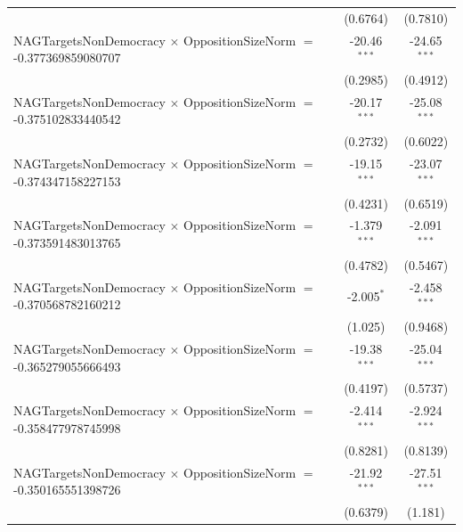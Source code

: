 \begin{tabular}{lcc}
                                                                                & (0.6764)             & (0.7810)\\   
   NAGTargetsNonDemocracy $\times$ OppositionSizeNorm $=$ -0.377369859080707    & -20.46$^{***}$       & -24.65$^{***}$\\   
                                                                                & (0.2985)             & (0.4912)\\   
   NAGTargetsNonDemocracy $\times$ OppositionSizeNorm $=$ -0.375102833440542    & -20.17$^{***}$       & -25.08$^{***}$\\   
                                                                                & (0.2732)             & (0.6022)\\   
   NAGTargetsNonDemocracy $\times$ OppositionSizeNorm $=$ -0.374347158227153    & -19.15$^{***}$       & -23.07$^{***}$\\   
                                                                                & (0.4231)             & (0.6519)\\   
   NAGTargetsNonDemocracy $\times$ OppositionSizeNorm $=$ -0.373591483013765    & -1.379$^{***}$       & -2.091$^{***}$\\   
                                                                                & (0.4782)             & (0.5467)\\   
   NAGTargetsNonDemocracy $\times$ OppositionSizeNorm $=$ -0.370568782160212    & -2.005$^{*}$         & -2.458$^{***}$\\   
                                                                                & (1.025)              & (0.9468)\\   
   NAGTargetsNonDemocracy $\times$ OppositionSizeNorm $=$ -0.365279055666493    & -19.38$^{***}$       & -25.04$^{***}$\\   
                                                                                & (0.4197)             & (0.5737)\\   
   NAGTargetsNonDemocracy $\times$ OppositionSizeNorm $=$ -0.358477978745998    & -2.414$^{***}$       & -2.924$^{***}$\\   
                                                                                & (0.8281)             & (0.8139)\\   
   NAGTargetsNonDemocracy $\times$ OppositionSizeNorm $=$ -0.350165551398726    & -21.92$^{***}$       & -27.51$^{***}$\\   
                                                                                & (0.6379)             & (1.181)\\   

\end{tabular}
